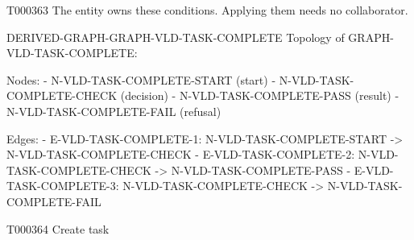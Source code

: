 \documentclass[11pt,a4paper]{article}
\begin{document}
\begin{atlasparagraph}{T000363}
The entity owns these conditions. Applying them needs no collaborator.
\end{atlasparagraph}
\begin{atlasderived}{DERIVED-GRAPH-GRAPH-VLD-TASK-COMPLETE}
Topology of GRAPH-VLD-TASK-COMPLETE:

Nodes:
- N-VLD-TASK-COMPLETE-START (start)
- N-VLD-TASK-COMPLETE-CHECK (decision)
- N-VLD-TASK-COMPLETE-PASS (result)
- N-VLD-TASK-COMPLETE-FAIL (refusal)

Edges:
- E-VLD-TASK-COMPLETE-1: N-VLD-TASK-COMPLETE-START -> N-VLD-TASK-COMPLETE-CHECK
- E-VLD-TASK-COMPLETE-2: N-VLD-TASK-COMPLETE-CHECK -> N-VLD-TASK-COMPLETE-PASS
- E-VLD-TASK-COMPLETE-3: N-VLD-TASK-COMPLETE-CHECK -> N-VLD-TASK-COMPLETE-FAIL
\end{atlasderived}
\par{}\hypertarget{technical-GRAPH-TASK-CREATE}{}
\begin{atlastext}{T000364}
Create task
\end{atlastext}
\par{}
\end{document}
